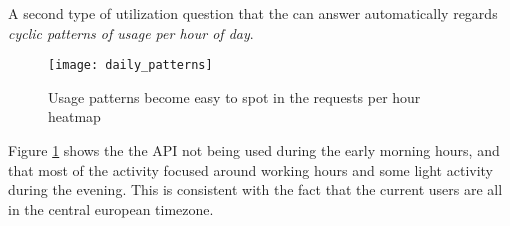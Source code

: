   A second type of utilization question that the \tool can answer automatically regards {\em cyclic patterns of usage per hour of day}. 


    \begin{figure}[!ht]
      \centering
      \texttt{[image: daily\_patterns]}
      \caption{Usage patterns become easy to spot in the requests per hour heatmap}
      \label{fig:dp}
    \end{figure}


  Figure \ref{fig:dp} shows the the API not being used during the early morning hours, and that most of the activity focused around working hours and some light activity during the evening. This is consistent with the fact that the current users are all in the central european timezone. 

